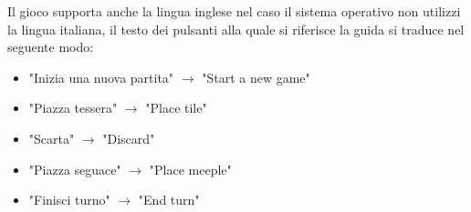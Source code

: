 Il gioco supporta anche la lingua inglese nel caso il sistema operativo non utilizzi la lingua italiana, il testo dei pulsanti alla quale si riferisce la guida si traduce nel seguente modo:
\begin{itemize}
    \item "Inizia una nuova partita" $\rightarrow$ "Start a new game"
    \item "Piazza tessera" $\rightarrow$ "Place tile"
    \item "Scarta" $\rightarrow$ "Discard"
    \item "Piazza seguace" $\rightarrow$ "Place meeple"
    \item "Finisci turno" $\rightarrow$ "End turn"
\end{itemize}

